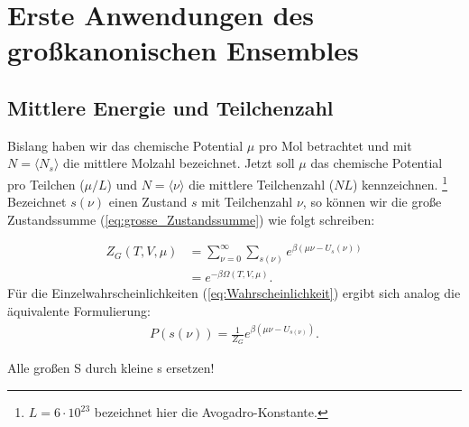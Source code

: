 \chapter{Erste Anwendungen des großkanonischen Ensembles}
\section{Mittlere Energie und Teilchenzahl}
Bislang haben wir das chemische Potential $\mu$ pro Mol betrachtet und mit 
$N=\langle N_s \rangle$ die mittlere Molzahl bezeichnet. Jetzt soll $\mu$ das 
chemische Potential pro Teilchen ($\mu/L$) und $N=\langle \nu \rangle$ die 
mittlere Teilchenzahl ($NL$) kennzeichnen. \footnote{$L=6\cdot 10^{23}$ bezeichnet hier die Avogadro-Konstante.} Bezeichnet $s(\nu)$ einen Zustand $s$ 
mit Teilchenzahl $\nu$, so können wir die große Zustandssumme (\ref{eq:grosse_Zustandssumme}) wie folgt schreiben:

\begin{align*}
    Z_G(T,V,\mu)&=\sum_{\nu=0}^{\infty}\sum_{s(\nu)} e^{\beta(\mu \nu -U_s(\nu))}\\
    &=e^{-\beta \Omega(T,V,\mu)}.
\end{align*}
Für die Einzelwahrscheinlichkeiten (\ref{eq:Wahrscheinlichkeit}) ergibt sich analog die äquivalente Formulierung:
\begin{align*}
    P(s(\nu))=\frac{1}{Z_G}e^{\beta(\mu \nu-U_{s(\nu)})}.
\end{align*}

Alle großen S durch kleine s ersetzen!

